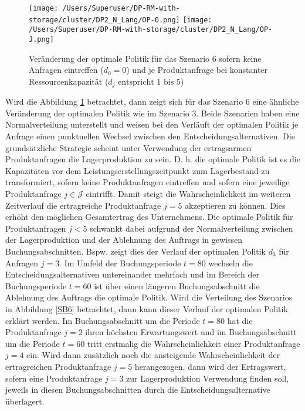 \begin{figure}[h!]     
\begin{center}
\texttt{[image: /Users/Superuser/DP-RM-with-storage/cluster/DP2\_N\_Lang/OP-0.png]}
\texttt{[image: /Users/Superuser/DP-RM-with-storage/cluster/DP2\_N\_Lang/OP-J.png]}
    \caption{Veränderung der optimale Politik für das Szenario 6 sofern keine Anfragen eintreffen ($d_0=0$) und je Produktanfrage bei konstanter Ressourcenkapazität ($d_j\text{ entspricht }1\text{ bis }5$)}  \label{SV6}
  \end{center}
\end{figure}

Wird die Abbildung \ref{SV6} betrachtet, dann zeigt sich für das Szenario 6 eine ähnliche Veränderung der optimalen Politik wie im Szenario 3. Beide Szenarien haben eine Normalverteilung unterstellt und weisen bei den Verläuft der optimalen Politik je Anfrage einen punktuellen Wechsel zwischen den Entscheidungsalternativen. Die grundsätzliche Strategie scheint unter Verwendung der ertragsarmen Produktanfragen die \glqq Lagerproduktion{\grqq} zu sein. D. h. die optimale Politik ist es die Kapazitäten vor dem Leistungserstellungszeitpunkt zum Lagerbestand zu transformiert, sofern keine Produktanfragen eintreffen und sofern eine jeweilige Produktanfrage $j\in\mathcal{J}$ eintrifft. Damit steigt die Wahrscheinlichkeit im weiteren Zeitverlauf die ertragreiche Produktanfrage $j=5$ akzeptieren zu können. Dies erhöht den möglichen Gesamtertrag des Unternehmens. Die optimale Politik für Produktanfragen $j<5$ schwankt dabei aufgrund der Normalverteilung zwischen der \glqq Lagerproduktion{\grqq} und der \glqq Ablehnung des Auftrags{\grqq} in gewissen Buchungsabschnitten. Bspw. zeigt dies der Verlauf der optimalen Politik $d_3$ für Anfragen $j=3$. Im Umfeld der Buchungsperiode $t=80$ wechseln die Entscheidungsalternativen untereinander mehrfach und im Bereich der Buchungsperiode $t=60$ ist über einen längeren Buchungsabschnitt die \glqq Ablehnung des Auftrags{\grqq} die optimale Politik. Wird die Verteilung des Szenarios in Abbildung \ref{SB6} betrachtet, dann kann dieser Verlauf der optimalen Politik erklärt werden. Im Buchungsabschnitt um die Periode $t=80$ hat die Produktanfrage $j=2$ ihren höchsten Erwartungswert und im Buchungsabschnitt um die Periode $t=60$ tritt erstmalig die Wahrscheinlichkeit einer Produktanfrage $j=4$ ein. Wird dann zusätzlich noch die ansteigende Wahrscheinlichkeit der ertragreichen Produktanfrage $j=5$ herangezogen, dann wird der Ertragswert, sofern eine Produktanfrage $j=3$ zur Lagerproduktion Verwendung finden soll, jeweils in diesen Buchungsabschnitten durch die Entscheidungsalternative überlagert.\\[.5cm]

